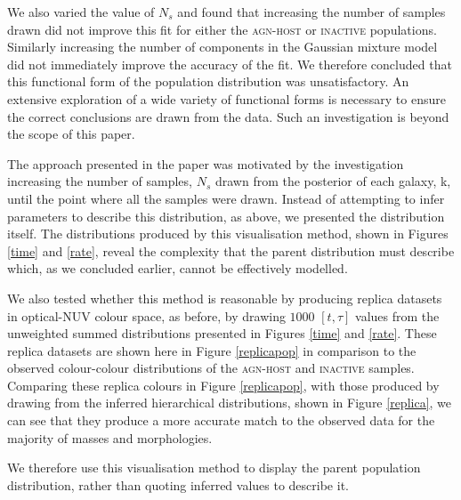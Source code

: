 \documentclass[useAMS,usenatbib]{mn2e}
\begin{document}
{We also varied the value of $N_s$ and found that increasing the number of samples drawn did not improve this fit for either the \textsc{agn-host} or \textsc{inactive} populations. Similarly increasing the number of components in the Gaussian mixture model did not immediately improve the accuracy of the fit.  We therefore concluded that this functional form of the population distribution was unsatisfactory. An extensive exploration of a wide variety of functional forms is necessary to ensure the correct conclusions are drawn from the data. Such an investigation is beyond the scope of this paper. 

The approach presented in the paper was motivated by the investigation increasing the number of samples, $N_s$ drawn from the posterior of each galaxy, k, until the point where all the samples were drawn. Instead of attempting to infer parameters to describe this distribution, as above, we presented the distribution itself.  The distributions produced by this visualisation method, shown in Figures \ref{time} and \ref{rate}, reveal the complexity that the parent distribution must describe which, as we concluded earlier, cannot be effectively modelled.

We also tested whether this method is reasonable by producing replica datasets in optical-NUV colour space, as before, by drawing $1000$ $[t, \tau]$ values from the unweighted summed distributions presented in Figures \ref{time} and \ref{rate}. These replica datasets are shown here in Figure \ref{replicapop} in comparison to the observed colour-colour distributions of the \textsc{agn-host} and \textsc{inactive} samples. Comparing these replica colours in Figure \ref{replicapop}, with those produced by drawing from the inferred hierarchical distributions, shown in Figure \ref{replica}, we can see that they produce a more accurate match to the observed data for the majority of masses and morphologies. 

We therefore use this visualisation method to display the parent population distribution, rather than quoting inferred values to describe it.}
\end{document}
